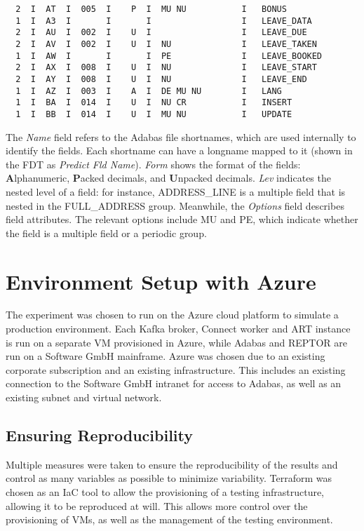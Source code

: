 \begin{verbatim}
  2  I  AT  I  005  I    P  I  MU NU           I   BONUS                     
  1  I  A3  I       I       I                  I   LEAVE_DATA                
  2  I  AU  I  002  I    U  I                  I   LEAVE_DUE
  2  I  AV  I  002  I    U  I  NU              I   LEAVE_TAKEN               
  1  I  AW  I       I       I  PE              I   LEAVE_BOOKED              
  2  I  AX  I  008  I    U  I  NU              I   LEAVE_START               
  2  I  AY  I  008  I    U  I  NU              I   LEAVE_END                 
  1  I  AZ  I  003  I    A  I  DE MU NU        I   LANG                      
  1  I  BA  I  014  I    U  I  NU CR           I   INSERT                    
  1  I  BB  I  014  I    U  I  MU NU           I   UPDATE                    
\end{verbatim}

The \textit{Name} field refers to the Adabas file shortnames, which are used internally to identify the fields. Each shortname can have a longname mapped to it (shown in the \ac{FDT} as \textit{Predict Fld Name}). \textit{Form} shows the format of the fields: \textbf{A}lphanumeric, \textbf{P}acked decimals, and \textbf{U}npacked decimals. \textit{Lev} indicates the nested level of a field: for instance, ADDRESS\_LINE is a multiple field that is nested in the FULL\_ADDRESS group. Meanwhile, the \textit{Options} field describes field attributes. The relevant options include MU and PE, which indicate whether the field is a multiple field or a periodic group.

\section{Environment Setup with Azure}
\label{ch05:methodology:environmentsetup}
The experiment was chosen to run on the Azure cloud platform to simulate a production environment. Each Kafka broker, Connect worker and \ac{ART} instance is run on a separate \ac{VM} provisioned in Azure, while Adabas and \ac{REPTOR} are run on a Software GmbH mainframe. Azure was chosen due to an existing corporate subscription and an existing infrastructure. This includes an existing connection to the Software GmbH intranet for access to Adabas, as well as an existing subnet and virtual network.

\subsection{Ensuring Reproducibility}
Multiple measures were taken to ensure the reproducibility of the results and control as many variables as possible to minimize variability. Terraform was chosen as an \ac{IaC} tool to allow the provisioning of a testing infrastructure, allowing it to be reproduced at will. This allows more control over the provisioning of \ac{VM}s, as well as the management of the testing environment.

